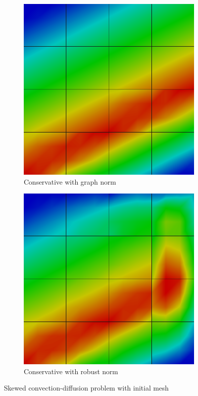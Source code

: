 \documentclass[letterpaper]{article}
\begin{document}
\begin{figure}
\centering
\begin{subfigure}[t]{0.45\textwidth}
\centering
\includegraphics[width=\textwidth]{figs/Confusion/graph0c.png}
\caption{Conservative with graph norm}
\label{fig:confusionGraph0c}
\end{subfigure}
\begin{subfigure}[t]{0.45\textwidth}
\centering
\includegraphics[width=\textwidth]{figs/Confusion/robust0c.png}
\caption{Conservative with robust norm}
\label{fig:confusionRobust0c}
\end{subfigure}
\caption{Skewed convection-diffusion problem with initial mesh}
\end{figure}
\end{document}
